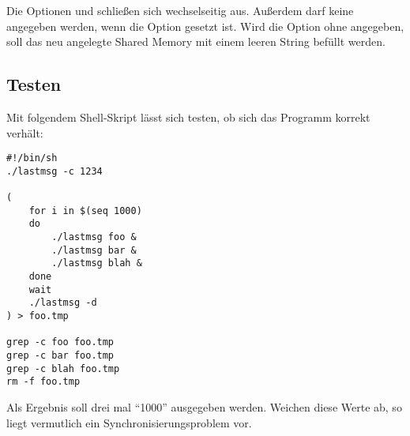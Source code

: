 Die Optionen  und  schließen sich wechselseitig aus.
Außerdem darf keine  angegeben werden, wenn die
Option  gesetzt ist. Wird die Option  ohne
 angegeben, soll das neu angelegte Shared Memory
mit einem leeren String befüllt werden.

\subsection*{Testen}

Mit folgendem Shell-Skript lässt sich testen, ob sich das Programm korrekt
verhält:

\pagebreak[4]

\begin{verbatim}
#!/bin/sh
./lastmsg -c 1234

(
    for i in $(seq 1000)
    do
        ./lastmsg foo &
        ./lastmsg bar &
        ./lastmsg blah &
    done
    wait
    ./lastmsg -d
) > foo.tmp

grep -c foo foo.tmp
grep -c bar foo.tmp
grep -c blah foo.tmp
rm -f foo.tmp
\end{verbatim}

Als Ergebnis soll drei mal "`1000"' ausgegeben werden. Weichen diese Werte
ab, so liegt vermutlich ein Synchronisierungsproblem vor.

\osueguidelinesthree


